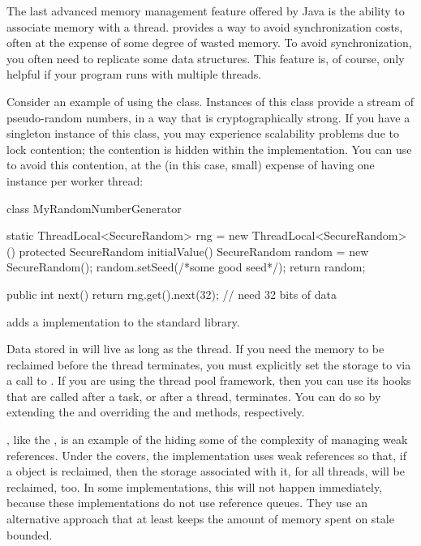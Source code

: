 The last advanced memory management feature offered by Java is the ability to
associate memory with a thread. \Tls provides a way to avoid
synchronization costs, often at the expense of some degree of wasted memory. To
avoid synchronization, you often need to replicate some data structures. This
feature is, of course, only helpful if your program runs with multiple threads.

Consider an example of using the  class. Instances of this
class provide a stream of pseudo-random numbers, in a way that is
cryptographically strong. If you have a singleton instance of this class, you may
experience scalability problems due to lock contention; the contention is hidden
within the  implementation. You can use \tls
to avoid this contention, at the (in this case, small) expense of having one
instance per worker thread:
\begin{shortlisting}
class MyRandomNumberGenerator {
   static ThreadLocal<SecureRandom> rng = new ThreadLocal<SecureRandom>() {
      protected SecureRandom initialValue() {
         SecureRandom random = new SecureRandom();
         random.setSeed(/*some good seed*/);
         return random;
      }
   }
   
   public int next() {
      return rng.get().next(32); // need 32 bits of data
   }
}
\end{shortlisting} 
\javaseven adds a  implementation to the standard
library.

Data stored in \tls will live as long as the thread. If you need
the memory to be reclaimed before the thread terminates, you must explicitly set
the storage to  via a call to . If you are using
the  thread pool framework, then you can use its
hooks that are called after a task, or after a thread, terminates. You can do so
by extending the  and overriding the
 and  methods, respectively.

\Tls, like the , is an example of the \jre hiding some of the
complexity of managing weak references. Under the covers, the \tls implementation
uses weak references so that, if a  object is reclaimed, then
the storage associated with it, for all threads, will be reclaimed, too. In some
implementations, this will not happen immediately, because these implementations
do not use reference queues. They use an alternative approach that at least
keeps the amount of memory spent on stale \tls bounded.

